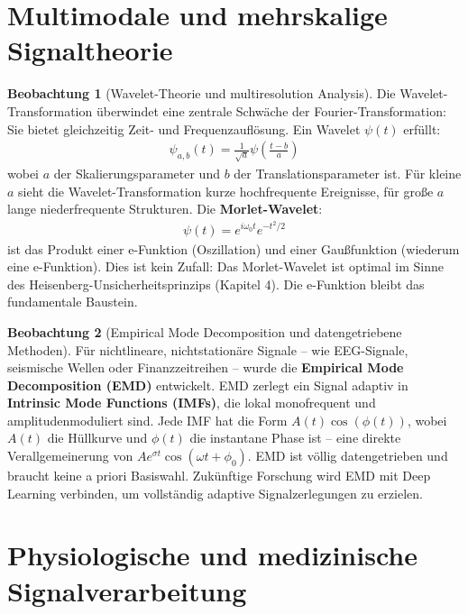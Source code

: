 ﻿\documentclass[a4paper,12pt]{report}
\theoremstyle{definition}
\newtheorem{beobachtung}{Beobachtung}
\begin{document}
	\section{Multimodale und mehrskalige Signaltheorie}
	
	\begin{beobachtung}[Wavelet-Theorie und multiresolution Analysis]
		Die Wavelet-Trans\-formation überwindet eine zentrale Schwäche der Fourier-Transformation: Sie bietet gleichzeitig Zeit- und Frequenzauflösung. Ein Wavelet $\psi(t)$ erfüllt:
		\begin{align}
			\psi_{a,b}(t) = \frac{1}{\sqrt{a}} \psi\left(\frac{t-b}{a}\right)
		\end{align}
		wobei $a$ der Skalierungsparameter und $b$ der Translationsparameter ist. Für kleine $a$ sieht die Wavelet-Transformation kurze hochfrequente Ereignisse, für große $a$ lange niederfrequente Strukturen. Die \textbf{Morlet-Wavelet}:
		\begin{align}
			\psi(t) = e^{i\omega_0 t} e^{-t^2/2}
		\end{align}
		ist das Produkt einer e-Funktion (Oszillation) und einer Gaußfunktion (wiederum eine e-Funktion). Dies ist kein Zufall: Das Morlet-Wavelet ist optimal im Sinne des Heisenberg-Unsicherheitsprinzips (Kapitel 4). Die e-Funktion bleibt das fundamen\-tale Baustein.
	\end{beobachtung}
	
	\begin{beobachtung}[Empirical Mode Decomposition und datengetriebene Methoden]
		Für nichtlineare, nichtstationäre Signale -- wie EEG-Signale, seismische Wellen oder Finanzzeitreihen -- wurde die \textbf{Empirical Mode Decomposition (EMD)} entwickelt. EMD zerlegt ein Signal adaptiv in \textbf{Intrinsic Mode Functions (IMFs)}, die lokal monofrequent und amplitudenmoduliert sind. Jede IMF hat die Form $A(t) \cos(\phi(t))$, wobei $A(t)$ die Hüllkurve und $\phi(t)$ die instantane Phase ist -- eine direkte Verallgemeinerung von $A e^{\sigma t} \cos(\omega t + \phi_0)$. EMD ist völlig datengetrieben und braucht keine a priori Basiswahl. Zukünftige Forschung wird EMD mit Deep Learning verbinden, um vollständig adaptive Signalzerlegungen zu erzielen.
	\end{beobachtung}
	
	\section{Physiologische und medizinische Signalverarbeitung}
	
\end{document}
